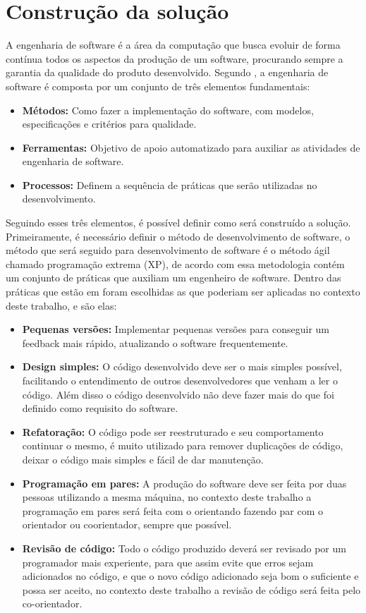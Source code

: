 \section{Construção da solução}
\label{section:construcao}

A engenharia de software é a área da computação que busca evoluir de forma contínua
todos os aspectos da produção de um software, procurando sempre a garantia da
qualidade do produto desenvolvido. Segundo \cite{pressman2011engenharia}, a engenharia
de software é composta por um conjunto de três elementos fundamentais:

\begin{itemize}
  \item \textbf{Métodos:} Como fazer a implementação do software, com modelos,
  especificações e critérios para qualidade.
  \item \textbf{Ferramentas:} Objetivo de apoio automatizado para auxiliar as atividades
  de engenharia de software.
  \item \textbf{Processos:} Definem a sequência de práticas que serão utilizadas no
  desenvolvimento.
\end{itemize}

Seguindo esses três elementos, é possível definir como será construído a solução.
Primeiramente, é necessário definir o método de desenvolvimento de software, o
método que será seguido para desenvolvimento de software é o método ágil chamado
programação extrema (XP), de acordo com \cite{796139} essa metodologia contém um
conjunto de práticas que auxiliam um engenheiro de software. Dentro das práticas
que estão em\cite{796139} foram escolhidas as que poderiam ser aplicadas no
contexto deste trabalho, e são elas:

\begin{itemize}
  \item \textbf{Pequenas versões:} Implementar pequenas versões para conseguir
  um feedback mais rápido, atualizando o software frequentemente.
  \item \textbf{Design simples:} O código desenvolvido deve ser o mais simples possível,
  facilitando o entendimento de outros desenvolvedores que venham a ler o código.
  Além disso o código desenvolvido não deve fazer mais do que foi definido como
  requisito do software.
  \item \textbf{Refatoração:} O código pode ser reestruturado e seu comportamento
  continuar o mesmo, é muito utilizado para remover duplicações de código, deixar
  o código mais simples e fácil de dar manutenção.
  \item \textbf{Programação em pares:} A produção do software deve ser feita por duas
  pessoas utilizando a mesma máquina, no contexto deste trabalho a programação
  em pares será feita com o orientando fazendo par com o orientador ou coorientador,
  sempre que possível.
  \item \textbf{Revisão de código:} Todo o código produzido deverá ser revisado
  por um programador mais experiente, para que assim evite que erros sejam
  adicionados no código, e que o novo código adicionado seja bom o suficiente
  e possa ser aceito, no contexto deste trabalho a revisão de código será
  feita pelo co-orientador.
\end{itemize}

